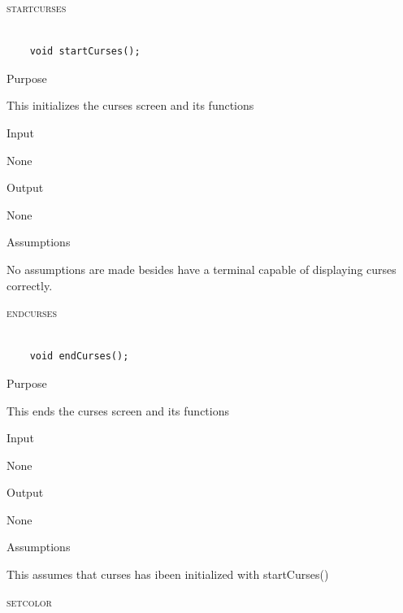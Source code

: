 \documentclass[pdftex, 11pt]{article}
\begin{document}
\begin{description}

	\item{\textsc{startcurses}}

		\begin{lstlisting}

	void startCurses();
		\end{lstlisting}

		\begin{description}
			\item{Purpose}

				This initializes the curses screen and its functions

			\item{Input}

				None

			\item{Output}

				None

			\item{Assumptions}

				No assumptions are made besides have a terminal
				capable of displaying curses correctly.

		\end{description}


	\item{\textsc{endcurses}}

		\begin{lstlisting}

	void endCurses();
		\end{lstlisting}

		\begin{description}
			\item{Purpose}

				This ends the curses screen and its functions

			\item{Input}

				None

			\item{Output}

				None

			\item{Assumptions}

				This assumes that curses has ibeen initialized
				with startCurses()


		\end{description}


	\item{\textsc{setcolor}}


\end{description}
\end{document}

